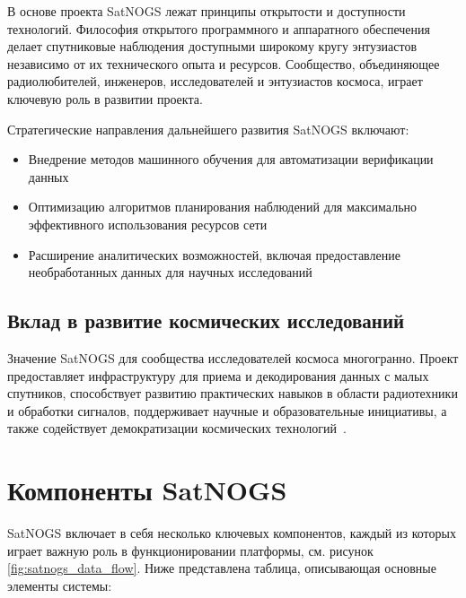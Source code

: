 В основе проекта SatNOGS лежат принципы открытости и доступности технологий.
Философия открытого программного и аппаратного обеспечения делает спутниковые
наблюдения доступными широкому кругу энтузиастов независимо от их технического
опыта и ресурсов. Сообщество, объединяющее радиолюбителей, инженеров,
исследователей и энтузиастов космоса, играет ключевую роль в развитии проекта.

Стратегические направления дальнейшего развития SatNOGS включают:

\begin{itemize}
	\item Внедрение методов машинного обучения для автоматизации верификации данных
	\item Оптимизацию алгоритмов планирования наблюдений для максимально эффективного использования ресурсов сети
	\item Расширение аналитических возможностей, включая предоставление необработанных данных для научных исследований
\end{itemize}

\subsection{Вклад в развитие космических исследований}

Значение SatNOGS для сообщества исследователей космоса многогранно. Проект
предоставляет инфраструктуру для приема и декодирования данных с малых
спутников, способствует развитию практических навыков в области радиотехники и
обработки сигналов, поддерживает научные и образовательные инициативы, а также
содействует демократизации космических технологий~\cite{satnogs_general_docs}.

\section{Компоненты SatNOGS}

SatNOGS включает в себя несколько ключевых компонентов, каждый из которых
играет важную роль в функционировании платформы, см. рисунок
\ref{fig:satnogs_data_flow}.
Ниже представлена таблица, описывающая основные элементы системы:

